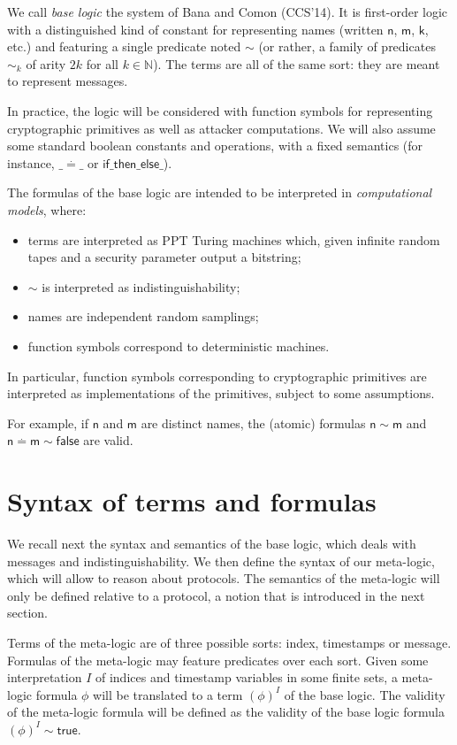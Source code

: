 We call \emph{base logic} the system of Bana and Comon (CCS'14).
It is first-order logic with a distinguished kind of constant for representing
names (written $\mathsf{n}$, $\mathsf{m}$, $\mathsf{k}$, etc.)
and featuring a single predicate noted $\sim$ (or rather, a family
of predicates $\sim_k$ of arity $2 k$ for all $k\in\mathbb{N}$).
The terms are all of the same sort: they are meant to represent
messages.

In practice, the logic will be considered with function symbols for
representing cryptographic primitives as well as attacker computations.
We will also assume some standard boolean constants and operations, with
a fixed semantics (for instance, $\_ \stackrel{.}{=} \_$ or
$\mathsf{if \_ then \_ else \_}$).

The formulas of the base logic are intended to be interpreted in
\emph{computational models}, where:
\begin{itemize}
  \item terms are interpreted as PPT Turing machines which,
    given infinite random tapes and a security parameter output a bitstring;
  \item $\sim$ is interpreted as indistinguishability;
  \item names are independent random samplings;
  \item function symbols correspond to deterministic machines.
\end{itemize}

In particular, function symbols corresponding to cryptographic primitives
are interpreted as implementations of the primitives, subject to some
assumptions.

For example, if $\mathsf{n}$ and $\mathsf{m}$ are distinct names,
the (atomic) formulas $\mathsf{n}\sim\mathsf{m}$ and
$\mathsf{n}\stackrel{.}{=}\mathsf{m}\sim\mathsf{false}$
are valid.

\section{Syntax of terms and formulas}

We recall next the syntax and semantics of the base logic, which deals with
messages and indistinguishability.
We then define the syntax of our meta-logic, which will allow to reason about
protocols. The semantics of the meta-logic will only be defined relative to a
protocol, a notion that is introduced in the next section.

Terms of the meta-logic are of three possible sorts: index, timestamps
or message. Formulas of the meta-logic may feature predicates over each sort.
Given some interpretation $I$ of indices and timestamp variables in some finite
sets, a meta-logic formula $\phi$ will be translated to a term $(\phi)^I$
of the base logic.
The validity of the meta-logic formula will be defined as the validity of the
base logic formula $(\phi)^I \sim \mathsf{true}$.

